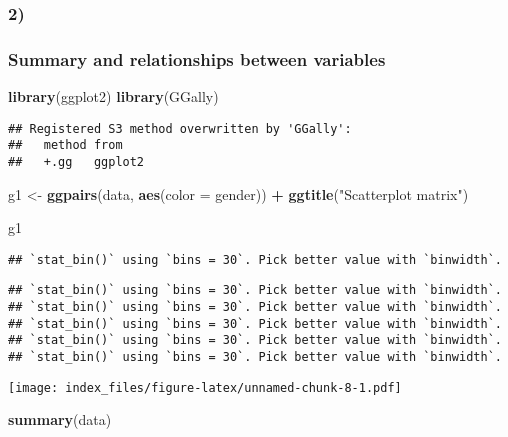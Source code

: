 \documentclass[]{article}
\newenvironment{Shaded}{\begin{snugshade}}{\end{snugshade}}
\newcommand{\KeywordTok}[1]{\textcolor[rgb]{0.13,0.29,0.53}{\textbf{#1}}}
\newcommand{\DataTypeTok}[1]{\textcolor[rgb]{0.13,0.29,0.53}{#1}}
\newcommand{\StringTok}[1]{\textcolor[rgb]{0.31,0.60,0.02}{#1}}
\newcommand{\OperatorTok}[1]{\textcolor[rgb]{0.81,0.36,0.00}{\textbf{#1}}}
\newcommand{\NormalTok}[1]{#1}
\begin{document}
\subsubsection{2)}\label{section-1}

\subsubsection{Summary and relationships between
variables}\label{summary-and-relationships-between-variables}

\begin{Shaded}
\begin{Highlighting}[]
\KeywordTok{library}\NormalTok{(ggplot2)}
\KeywordTok{library}\NormalTok{(GGally)}
\end{Highlighting}
\end{Shaded}

\begin{verbatim}
## Registered S3 method overwritten by 'GGally':
##   method from   
##   +.gg   ggplot2
\end{verbatim}

\begin{Shaded}
\begin{Highlighting}[]
\NormalTok{g1 <-}\StringTok{ }\KeywordTok{ggpairs}\NormalTok{(data, }\KeywordTok{aes}\NormalTok{(}\DataTypeTok{color =}\NormalTok{ gender)) }\OperatorTok{+}\StringTok{ }
\StringTok{  }\KeywordTok{ggtitle}\NormalTok{(}\StringTok{"Scatterplot matrix"}\NormalTok{)}

\NormalTok{g1}
\end{Highlighting}
\end{Shaded}

\begin{verbatim}
## `stat_bin()` using `bins = 30`. Pick better value with `binwidth`.
\end{verbatim}

\begin{verbatim}
## `stat_bin()` using `bins = 30`. Pick better value with `binwidth`.
## `stat_bin()` using `bins = 30`. Pick better value with `binwidth`.
## `stat_bin()` using `bins = 30`. Pick better value with `binwidth`.
## `stat_bin()` using `bins = 30`. Pick better value with `binwidth`.
## `stat_bin()` using `bins = 30`. Pick better value with `binwidth`.
\end{verbatim}

\texttt{[image: index\_files/figure-latex/unnamed-chunk-8-1.pdf]}

\begin{Shaded}
\begin{Highlighting}[]
\KeywordTok{summary}\NormalTok{(data)}
\end{Highlighting}
\end{Shaded}
\end{document}
